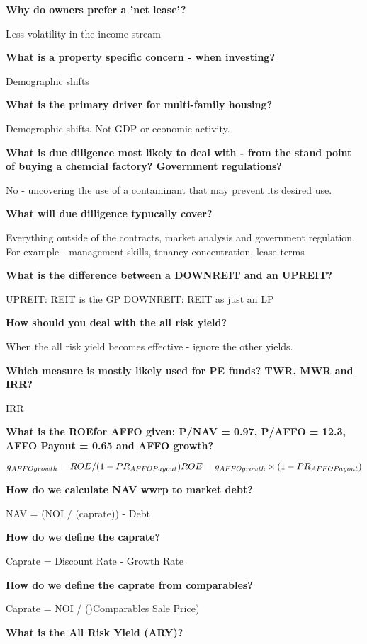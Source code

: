 \documentclass[12pt]{article}
\begin{document}
\textbf{Why do owners prefer a 'net lease'?}

Less volatility in the income stream

\textbf{What is a property specific concern - when investing?}

Demographic shifts

\textbf{What is the primary driver for multi-family housing?}

Demographic shifts. Not GDP or economic activity.

\textbf{What is due diligence most likely to deal with - from the stand point of buying a chemcial factory? Government regulations?}

No - uncovering the use of a contaminant that may prevent its desired use. 

\textbf{What will due dilligence typucally cover?}

Everything outside of the contracts, market analysis and government regulation.  For example - management skills, tenancy concentration, lease terms

\textbf{What is the difference between a DOWNREIT and an UPREIT?}

UPREIT: REIT is the GP
DOWNREIT: REIT as just an LP

\textbf{How should you deal with the all risk yield?}

When the all risk yield becomes effective - ignore the other yields. 

\textbf{Which measure is mostly likely used for PE funds? TWR, MWR and IRR?}

IRR

\textbf{What is the ROEfor AFFO given: P/NAV = 0.97, P/AFFO = 12.3, AFFO Payout = 0.65 and AFFO growth?}

$$
g_{AFFO growth} = ROE / (1 - PR_{AFFO Payout})\\
ROE = g_{AFFO growth} \times(1 - PR_{AFFO Payout})\\
$$

\textbf{How do we calculate NAV wwrp to market debt?}

NAV = (NOI / (caprate)) - Debt

\textbf{How do we define the caprate?}

Caprate = Discount Rate - Growth Rate

\textbf{How do we define the caprate from comparables?}

Caprate = NOI / ()Comparables Sale Price)

\textbf{What is the All Risk Yield (ARY)?}
\end{document}
